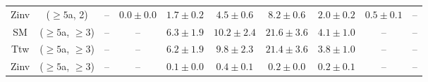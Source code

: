 \begin{table}[h!]
{\begin{tabular}{cccccccccc}
	Zinv & ($\ge5$a, 2) & -- & $0.0\pm 0.0$ & $1.7\pm 0.2$ & $4.5\pm 0.6$ & $8.2\pm 0.6$ & $2.0\pm 0.2$ & $0.5\pm 0.1$ & -- \\[0.5ex] 
	SM & ($\ge5$a, $\ge3$) & -- & -- & $6.3\pm 1.9$ & $10.2\pm 2.4$ & $21.6\pm 3.6$ & $4.1\pm 1.0$ & -- & -- \\[0.5ex] 
	Ttw & ($\ge5$a, $\ge3$) & -- & -- & $6.2\pm 1.9$ & $9.8\pm 2.3$ & $21.4\pm 3.6$ & $3.8\pm 1.0$ & -- & -- \\[0.5ex] 
	Zinv & ($\ge5$a, $\ge3$) & -- & -- & $0.1\pm 0.0$ & $0.4\pm 0.1$ & $0.2\pm 0.0$ & $0.2\pm 0.1$ & -- & -- \\[0.5ex] 
	\hline
	\hline
\end{tabular}}
\end{table}
